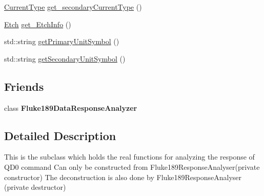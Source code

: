 \begin{DoxyCompactItemize}
\hyperlink{classFluke_1_1Fluke189DataResponseAnalyzerWrapper_afef24496da239e3613c40ad3582d7adc}{CurrentType} \hyperlink{classFluke_1_1Fluke189DataResponseAnalyzerWrapperQD0_aa46ac22750b412df37ae24db84fab138}{get\_\-secondaryCurrentType} ()
\item 
\hyperlink{classFluke_1_1Fluke189DataResponseAnalyzerWrapper_ada71f6ab32a7b0eb40bb0ed96d7053bc}{Etch} \hyperlink{classFluke_1_1Fluke189DataResponseAnalyzerWrapperQD0_a8a50c55ebd21461e4c934a1eb4b07641}{get\_\-EtchInfo} ()
\item 
std::string \hyperlink{classFluke_1_1Fluke189DataResponseAnalyzerWrapperQD0_af0968b6176ba724d21a89547147f9be5}{getPrimaryUnitSymbol} ()
\item 
std::string \hyperlink{classFluke_1_1Fluke189DataResponseAnalyzerWrapperQD0_af7a5731fbbd6ac2a7ab2a8d0a9f2ffe6}{getSecondaryUnitSymbol} ()
\end{DoxyCompactItemize}
\subsection*{Friends}
\begin{DoxyCompactItemize}
\item 
\hypertarget{classFluke_1_1Fluke189DataResponseAnalyzerWrapperQD0_a268eb1bf9fac46f61af93c2c1e309713}{
class {\bfseries Fluke189DataResponseAnalyzer}}
\label{classFluke_1_1Fluke189DataResponseAnalyzerWrapperQD0_a268eb1bf9fac46f61af93c2c1e309713}

\end{DoxyCompactItemize}


\subsection{Detailed Description}
This is the subclass which holds the real functions for analyzing the response of QD0 command Can only be constructed from Fluke189ResponseAnalyser(private constructor) The deconstruction is also done by Fluke189ResponseAnalyser (private destructor) 

